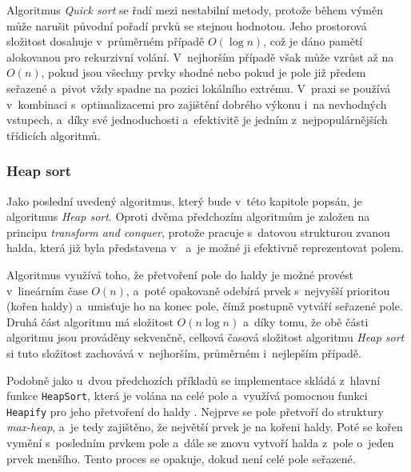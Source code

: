 Algoritmus \textit{Quick sort} se řadí mezi nestabilní metody, protože během výměn může narušit původní pořadí prvků se stejnou hodnotou.
Jeho prostorová složitost dosahuje v~průměrném případě $O(\log n)$, což je dáno pamětí alokovanou pro rekurzivní volání.
V~nejhorším případě však může vzrůst až na $O(n)$, pokud jsou všechny prvky shodné nebo pokud je pole již předem seřazené a~pivot vždy spadne na pozici lokálního extrému.
V~praxi se používá v~kombinaci s~optimalizacemi pro zajištění dobrého výkonu i~na nevhodných vstupech, a~díky své jednoduchosti a~efektivitě je jedním z~nejpopulárnějších třídicích algoritmů.~\cite{morin2013}

\subsubsection*{Heap sort}

Jako poslední uvedený algoritmus, který bude v~této kapitole popsán, je algoritmus \textit{Heap sort}.
Oproti dvěma předchozím algoritmům je založen na principu \textit{transform and conquer}, protože pracuje s~datovou strukturou zvanou halda, která již byla představena v~ a~je možné ji efektivně reprezentovat polem.

\begin{listing}[ht]
    
    \caption{Pseudokód algoritmu Heap sort}
    \label{lst:heapSort}
\end{listing}

Algoritmus využívá toho, že přetvoření pole do haldy je možné provést v~lineárním čase $O(n)$, a~poté opakovaně odebírá prvek s~nejvyšší prioritou (kořen haldy) a~umisťuje ho na konec pole, čímž postupně vytváří seřazené pole.
Druhá část algoritmu má složitost $O(n \log n)$ a~díky tomu, že obě části algoritmu jsou prováděny sekvenčně, celková časová složitost algoritmu \textit{Heap sort} si tuto složitost zachovává v~nejhorším, průměrném i~nejlepším případě.~\cite{levitin}

Podobně jako u~dvou předchozích příkladů se implementace skládá z~hlavní funkce \texttt{HeapSort}, která je volána na celé pole a~využívá pomocnou funkci \texttt{Heapify} pro jeho přetvoření do haldy .
Nejprve se pole přetvoří do struktury \textit{max-heap}, a~je tedy zajištěno, že největší prvek je na kořeni haldy.
Poté se kořen vymění s~posledním prvkem pole a~dále se znovu vytvoří halda z~pole o~jeden prvek menšího.
Tento proces se opakuje, dokud není celé pole seřazené.

